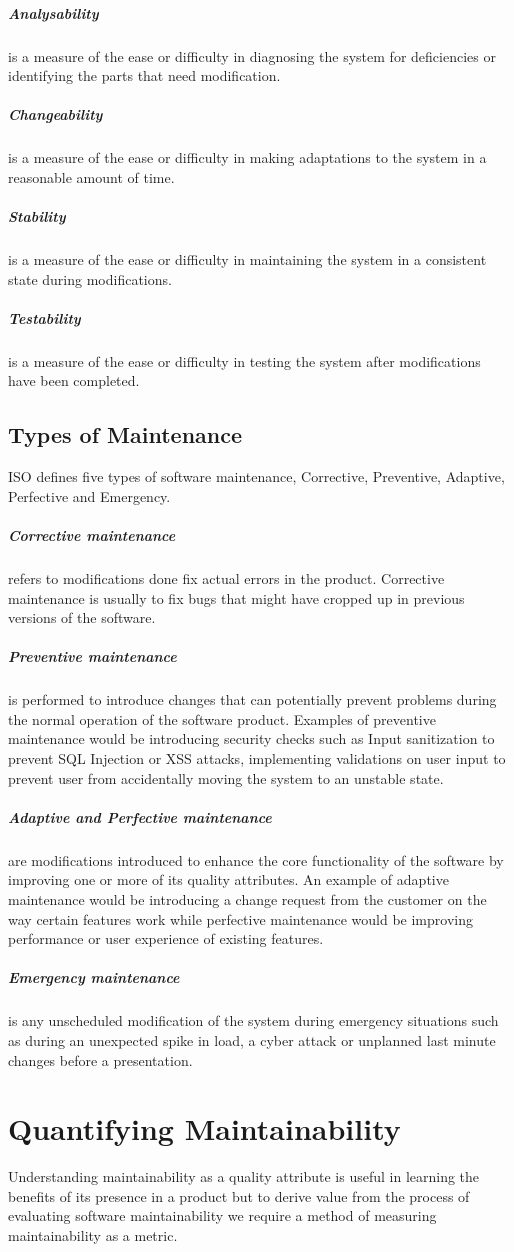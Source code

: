 \documentclass[15pt]{article}
\begin{document}
\subparagraph{Analysability} is a measure of the ease or difficulty in diagnosing the system for deficiencies or identifying the parts that need modification.

\subparagraph{Changeability} is a measure of the ease or difficulty in making adaptations to the system in a reasonable amount of time.

\subparagraph{Stability} is a measure of the ease or difficulty in maintaining the system in a consistent state during modifications.

\subparagraph{Testability} is a measure of the ease or difficulty in testing the system after modifications have been completed.

\subsection{Types of Maintenance}
ISO defines five types of software maintenance, Corrective, Preventive, Adaptive, Perfective and Emergency. \\

\subparagraph{Corrective maintenance} refers to modifications done fix actual errors in the product. Corrective maintenance is usually to fix bugs that might have cropped up in previous versions of the software. 

\subparagraph{Preventive maintenance} is performed to introduce changes that can potentially prevent problems during the normal operation of the software product. Examples of preventive maintenance would be introducing security checks such as Input sanitization to prevent SQL Injection or XSS attacks, implementing validations on user input to prevent user from accidentally moving the system to an unstable state. 

\subparagraph{Adaptive and Perfective maintenance} are modifications introduced to enhance the core functionality of the software by improving one or more of its quality attributes. An example of adaptive maintenance would be introducing a change request from the customer on the way certain features work while perfective maintenance would be improving performance or user experience of existing features.

\subparagraph{Emergency maintenance} is any unscheduled modification of the system during emergency situations such as during an unexpected spike in load, a cyber attack or unplanned last minute changes before a presentation.

\section{Quantifying Maintainability}
Understanding maintainability as a quality attribute is useful in learning the benefits of its presence in a product but to derive value from the process of evaluating software maintainability we require a method of measuring maintainability as a metric.
\end{document}
